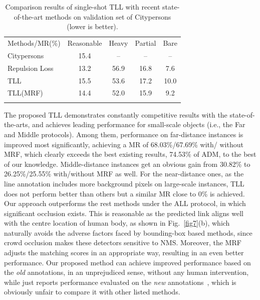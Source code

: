 \documentclass[runningheads]{llncs}
\begin{document}
\setlength{\tabcolsep}{4pt}
\begin{table}[t]
	\begin{center}
		\caption{Comparison results of single-shot TLL with recent state-of-the-art methods on validation set of Citypersons (lower is better).}
		\label{City_res_tab}
		\begin{tabular}{lcccc}
			\hline\noalign{\smallskip}
			Methods/MR(\%) & Reasonable & Heavy & Partial & Bare\\
			\noalign{\smallskip}
			\hline
			\noalign{\smallskip}
			Citypersons \cite{CityPersons}  & 15.4 & -- & -- & --\\
			Repulsion Loss\cite{RLoss}  & 13.2 & 56.9 & 16.8 & 7.6\\ 
			TLL    & 15.5 & 53.6 & 17.2 & 10.0\\
			TLL(MRF)  & 14.4 & 52.0 & 15.9 & 9.2\\
			\noalign{\smallskip}		
			\hline
		\end{tabular}
	\end{center}
\end{table}

\setlength{\tabcolsep}{1.4pt}
The proposed TLL demonstrates constantly competitive results with the state-of-the-arts, and achieves leading performance for small-scale objects (i.e., the Far and Middle protocols). Among them, performance on far-distance instances is improved most significantly, achieving a MR of 68.03\%/67.69\% with/ without MRF, which clearly exceeds the best existing results, 74.53\% of ADM, to the best of our knowledge. Middle-distance instances get an obvious gain from 30.82\% to 26.25\%/25.55\% with/without MRF as well. For the near-distance ones, as the line annotation includes more background pixels on large-scale instances, TLL does not perform better than others but a similar MR close to 0\% is achieved. Our approach outperforms the rest methods under the ALL protocol, in which significant occlusion exists. This is reasonable as the predicted link aligns well with the centre location of human body, as shown in Fig.~\ref{fig7}(b), which naturally avoids the adverse factors faced by bounding-box based methods, since crowd occlusion makes these detectors sensitive to NMS. Moreover, the MRF adjusts the matching scores in an appropriate way, resulting in an even better performance. Our proposed method can achieve improved performance based on the \emph{old} annotations, in an unprejudiced sense, without any human intervention, while \cite{RLoss} just reports performance evaluated on the \emph{new} annotations~\cite{NewCal}, which is obviously unfair to compare it with other listed methods.
\end{document}
